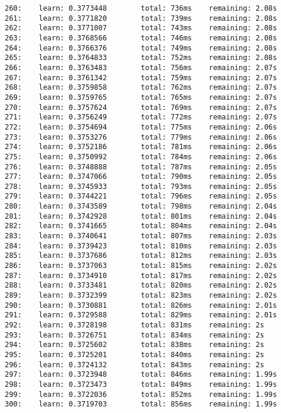 \documentclass[11pt]{article}
\begin{document}
\begin{Verbatim}[commandchars=\\\{\}]
260:    learn: 0.3773448        total: 736ms    remaining: 2.08s
261:    learn: 0.3771820        total: 739ms    remaining: 2.08s
262:    learn: 0.3771007        total: 743ms    remaining: 2.08s
263:    learn: 0.3768566        total: 746ms    remaining: 2.08s
264:    learn: 0.3766376        total: 749ms    remaining: 2.08s
265:    learn: 0.3764833        total: 752ms    remaining: 2.08s
266:    learn: 0.3763483        total: 756ms    remaining: 2.07s
267:    learn: 0.3761342        total: 759ms    remaining: 2.07s
268:    learn: 0.3759858        total: 762ms    remaining: 2.07s
269:    learn: 0.3759765        total: 765ms    remaining: 2.07s
270:    learn: 0.3757624        total: 769ms    remaining: 2.07s
271:    learn: 0.3756249        total: 772ms    remaining: 2.07s
272:    learn: 0.3754694        total: 775ms    remaining: 2.06s
273:    learn: 0.3753276        total: 779ms    remaining: 2.06s
274:    learn: 0.3752186        total: 781ms    remaining: 2.06s
275:    learn: 0.3750992        total: 784ms    remaining: 2.06s
276:    learn: 0.3748888        total: 787ms    remaining: 2.05s
277:    learn: 0.3747066        total: 790ms    remaining: 2.05s
278:    learn: 0.3745933        total: 793ms    remaining: 2.05s
279:    learn: 0.3744221        total: 796ms    remaining: 2.05s
280:    learn: 0.3743589        total: 798ms    remaining: 2.04s
281:    learn: 0.3742928        total: 801ms    remaining: 2.04s
282:    learn: 0.3741665        total: 804ms    remaining: 2.04s
283:    learn: 0.3740641        total: 807ms    remaining: 2.03s
284:    learn: 0.3739423        total: 810ms    remaining: 2.03s
285:    learn: 0.3737686        total: 812ms    remaining: 2.03s
286:    learn: 0.3737063        total: 815ms    remaining: 2.02s
287:    learn: 0.3734910        total: 817ms    remaining: 2.02s
288:    learn: 0.3733481        total: 820ms    remaining: 2.02s
289:    learn: 0.3732399        total: 823ms    remaining: 2.02s
290:    learn: 0.3730881        total: 826ms    remaining: 2.01s
291:    learn: 0.3729588        total: 829ms    remaining: 2.01s
292:    learn: 0.3728198        total: 831ms    remaining: 2s
293:    learn: 0.3726751        total: 834ms    remaining: 2s
294:    learn: 0.3725602        total: 838ms    remaining: 2s
295:    learn: 0.3725201        total: 840ms    remaining: 2s
296:    learn: 0.3724132        total: 843ms    remaining: 2s
297:    learn: 0.3723948        total: 846ms    remaining: 1.99s
298:    learn: 0.3723473        total: 849ms    remaining: 1.99s
299:    learn: 0.3722036        total: 852ms    remaining: 1.99s
300:    learn: 0.3719703        total: 856ms    remaining: 1.99s

\end{Verbatim}
\end{document}
